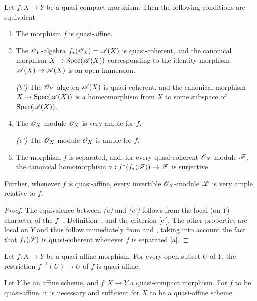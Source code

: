 \begin{prop}[5.1.6]
\label{2.5.1.6}
Let $f:X\to Y$ be a quasi-compact morphism.
Then the following conditions are equivalent.
\begin{enumerate}[label=\emph{(\alph*)}]
    \item The morphism $f$ is quasi-affine.
    \item The $\mathscr{O}_Y$-algebra $f_*(\mathscr{O}_X)=\mathscr{A}(X)$ is quasi-coherent, and the canonical morphism $X\to\Spec(\sh{A}(X))$ corresponding to the identity morphism $\sh{A}(X)\to\sh{A}(X)$  is an open immersion.
    \item[\emph{(b')}] The $\mathscr{O}_Y$-algebra $\mathscr{A}(X)$ is quasi-coherent, and the canonical morphism $X\to\Spec(\sh{A}(X))$ is a homeomorphism from $X$ to some subspace of ${\mathop{\mathrm{Spec}}\nolimits}(\mathscr{A}(X))$.
    \item The $\mathscr{O}_X$-module $\mathscr{O}_X$ is very ample for $f$.
    \item[\emph{(c')}] The $\mathscr{O}_X$-module $\mathscr{O}_X$ is ample for $f$.
    \item The morphism $f$ is separated, and, for every quasi-coherent $\mathscr{O}_X$-module $\mathscr{F}$, the canonical homomorphism $\sigma:f^*(f_*(\sh{F}))\to\sh{F}$  is surjective.
\end{enumerate}

Further, whenever $f$ is quasi-affine, every invertible $\mathscr{O}_X$-module $\mathscr{L}$ is very ample relative to $f$.
\end{prop}

\begin{proof}
\label{proof-2.5.1.6}
The equivalence between \emph{(a)} and \emph{(c')} follows from the local (on $Y$) character of the $f$- , Definition~, and the criterion [c'].
The other properties are local on $Y$
and thus follow immediately from  and , taking into account the fact that $f_*(\mathscr{F})$ is quasi-coherent whenever $f$ is separated [a].
\end{proof}

\begin{cor}[5.1.7]
\label{2.5.1.7}
Let $f:X\to Y$ be a quasi-affine morphism.
For every open subset $U$ of $Y$, the restriction $f^{-1}(U)\to U$ of $f$ is quasi-affine.
\end{cor}

\begin{cor}[5.1.8]
\label{2.5.1.8}
Let $Y$ be an affine scheme, and $f:X\to Y$ a quasi-compact morphism.
For $f$ to be quasi-affine, it is necessary and sufficient for $X$ to be a quasi-affine scheme.
\end{cor}

